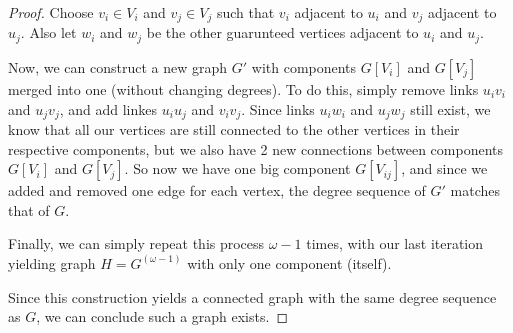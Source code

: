 \documentclass[11pt]{article}
\begin{document}
\begin{enumerate}
\begin{proof}
        Choose \(v_i \in V_i\) and \(v_j \in V_j\) such that \(v_i\) adjacent to \(u_i\) and \(v_j\) adjacent to \(u_j\).  Also let \(w_i\) and \(w_j\) be the other guarunteed vertices adjacent to \(u_i\) and \(u_j\).

        Now, we can construct a new graph \(G'\) with components \(G[V_i]\) and \(G[V_j]\) merged into one (without changing degrees).  To do this, simply remove links \(u_iv_i\) and \(u_jv_j\), and add linkes \(u_iu_j\) and \(v_iv_j\).  Since links \(u_iw_i\) and \(u_jw_j\) still exist, we know that all our vertices are still connected to the other vertices in their respective components, but we also have 2 new connections between components \(G[V_i]\) and \(G[V_j]\).  So now we have one big component \(G[V_{ij}]\), and since we added and removed one edge for each vertex, the degree sequence of \(G'\) matches that of \(G\).

        Finally, we can simply repeat this process \(\omega-1\) times, with our last iteration yielding graph \(H = G^{(\omega-1)}\) with only one component (itself).

        Since this construction yields a connected graph with the same degree sequence as \(G\), we can conclude such a graph exists.
      \end{proof}
      
  \end{enumerate}
\end{document}
